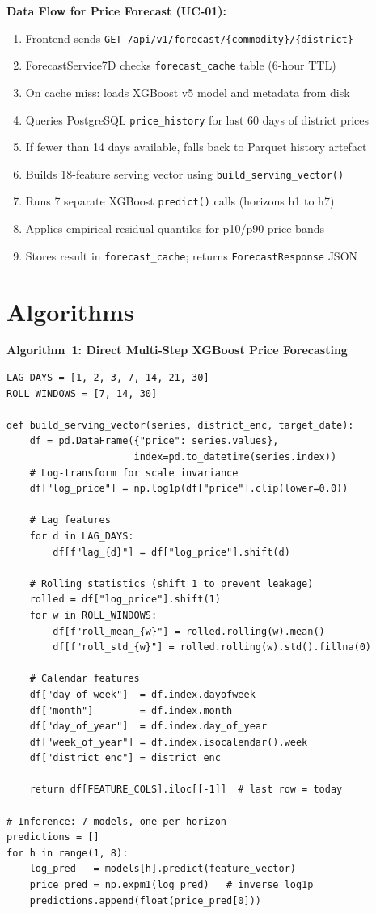 \documentclass[12pt,a4paper]{report}
\begin{document}
\textbf{Data Flow for Price Forecast (UC-01):}
\begin{enumerate}
    \item Frontend sends \texttt{GET /api/v1/forecast/\{commodity\}/\{district\}}
    \item ForecastService7D checks \texttt{forecast\_cache} table (6-hour TTL)
    \item On cache miss: loads XGBoost v5 model and metadata from disk
    \item Queries PostgreSQL \texttt{price\_history} for last 60 days of district prices
    \item If fewer than 14 days available, falls back to Parquet history artefact
    \item Builds 18-feature serving vector using \texttt{build\_serving\_vector()}
    \item Runs 7 separate XGBoost \texttt{predict()} calls (horizons h1 to h7)
    \item Applies empirical residual quantiles for p10/p90 price bands
    \item Stores result in \texttt{forecast\_cache}; returns \texttt{ForecastResponse} JSON
\end{enumerate}

\section{Algorithms}

\textbf{Algorithm~1: Direct Multi-Step XGBoost Price Forecasting}

\begin{lstlisting}[caption={Feature Vector Construction for 7-Day Forecast (features\_7d.py)}]
LAG_DAYS = [1, 2, 3, 7, 14, 21, 30]
ROLL_WINDOWS = [7, 14, 30]

def build_serving_vector(series, district_enc, target_date):
    df = pd.DataFrame({"price": series.values},
                      index=pd.to_datetime(series.index))
    # Log-transform for scale invariance
    df["log_price"] = np.log1p(df["price"].clip(lower=0.0))

    # Lag features
    for d in LAG_DAYS:
        df[f"lag_{d}"] = df["log_price"].shift(d)

    # Rolling statistics (shift 1 to prevent leakage)
    rolled = df["log_price"].shift(1)
    for w in ROLL_WINDOWS:
        df[f"roll_mean_{w}"] = rolled.rolling(w).mean()
        df[f"roll_std_{w}"] = rolled.rolling(w).std().fillna(0)

    # Calendar features
    df["day_of_week"]  = df.index.dayofweek
    df["month"]        = df.index.month
    df["day_of_year"]  = df.index.day_of_year
    df["week_of_year"] = df.index.isocalendar().week
    df["district_enc"] = district_enc

    return df[FEATURE_COLS].iloc[[-1]]  # last row = today

# Inference: 7 models, one per horizon
predictions = []
for h in range(1, 8):
    log_pred   = models[h].predict(feature_vector)
    price_pred = np.expm1(log_pred)   # inverse log1p
    predictions.append(float(price_pred[0]))
\end{lstlisting}
\end{document}
